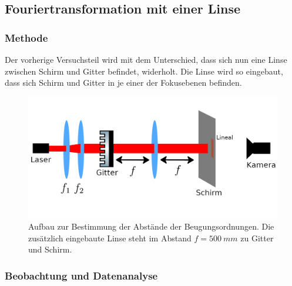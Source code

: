 \documentclass[
	a4paper,
	12pt,
	pagesize,
	ngerman
]{scrartcl}
\begin{document}
	\subsection{Fouriertransformation mit einer Linse} \label{ss_3_beug}

	\subsubsection*{Methode}

		Der vorherige Versuchsteil wird mit dem Unterschied, dass sich nun eine Linse zwischen Schirm und Gitter befindet, widerholt.
		Die Linse wird so eingebaut, dass sich Schirm und Gitter in je einer der Fokusebenen befinden.

	\begin{figure}[H]
			\includegraphics[width=1\linewidth]{img/gitterlinse}
			\caption{
				Aufbau zur Bestimmung der Abstände der Beugungsordnungen. Die zusätzlich eingebaute Linse steht im Abstand $f=\SI{500}{mm}$ zu Gitter und Schirm.
			}
			\label{fig_gitterlinse}
	\end{figure}

	\subsubsection*{Beobachtung und Datenanalyse}
\end{document}
